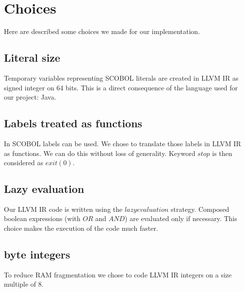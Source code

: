 \section{Choices}

Here are described some choices we made for our implementation.


\subsection{Literal size}

Temporary variables representing SCOBOL literals are created in LLVM IR as signed integer on 64 bits. This is a direct consequence of the language used for our project: Java.


\subsection{Labels treated as functions}

In SCOBOL labels can be used. We chose to translate those labels in LLVM IR as functions. We can do this without loss of generality. Keyword $stop$ is then considered as $exit(0)$.

\subsection{Lazy evaluation}

Our LLVM IR code is written using the $lazy evaluation$ strategy. Composed boolean expressions (with $OR$ and $AND$) are evaluated only if necessary. This choice makes the execution of the code much faster.

\subsection{byte integers}

To reduce RAM fragmentation we chose to code LLVM IR integers on a size multiple of 8.



